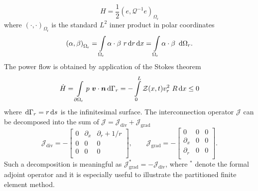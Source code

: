 \documentclass{ifacconf}
\begin{document}
\[
H = \frac{1}{2} \left(e, \mathcal{Q}^{-1} e  \right)_{\Omega_{\text{r}}}
\]
where $\left(\cdot, \cdot \right)_{\Omega_{\text{r}}}$ is the standard $L^2$ inner product in polar coordinates
\[
\left(\alpha, \beta \right)_{\Omega_{\text{r}}} = \int_{\Omega_{\text{r}}} \alpha \cdot \beta \ r \d{r} \d{x} = \int_{\Omega_{\text{r}}} \alpha \cdot \beta \ \d{\Omega_r}.
\]
The power flow is obtained by application of the Stokes theorem
\[
\dot{H} = \int_{\partial \Omega_{\text{r}}} p \ \bm{v} \cdot \bm{n} \d{\Gamma_r} = - \int_{0}^{L} \mathcal{Z}(x, t) v_r^2 \ R \d{x} \le 0 
\]
where $\,\mathrm{d}{\Gamma_r} = r \,\mathrm{d}{s}$ is the infinitesimal surface. The interconnection operator $\mathcal{J}$ can be decomposed into the sum of $\mathcal{J} = \mathcal{J}_{\text{div}} + \mathcal{J}_{\text{grad}}$
\begin{equation}
\label{eq:J_dec}
    \mathcal{J}_{\text{div}} = -\begin{bmatrix}
    0 & \partial_x & \partial_r + 1/r \\
    0 & 0 & 0 \\
    0 & 0 & 0 \\
    \end{bmatrix}, \qquad 
    \mathcal{J}_{\text{grad}} = -\begin{bmatrix}
    0 & 0 & 0 \\
    \partial_x & 0 & 0 \\
    \partial_r & 0 & 0 \\
    \end{bmatrix}.
\end{equation}
Such a decomposition is meaningful as $\mathcal{J}_{\text{grad}}^* = -\mathcal{J}_{\text{div}}$, where $^*$ denote the formal adjoint operator and it is especially useful to illustrate the partitioned finite element method. 
\end{document}
